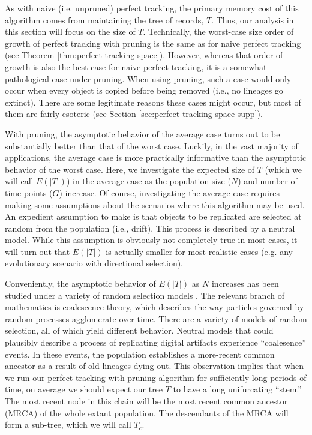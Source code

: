 As with naive (i.e. unpruned) perfect tracking, the primary memory cost of this algorithm comes from maintaining the tree of records, $T$.
Thus, our analysis in this section will focus on the size of $T$.
Technically, the worst-case size order of growth of perfect tracking with pruning is the same as for naive perfect tracking (see Theorem \ref{thm:perfect-tracking-space}).
However, whereas that order of growth is also the best case for naive perfect tracking, it is a somewhat pathological case under pruning.
When using pruning, such a case would only occur when every object is copied before being removed (i.e., no lineages go extinct).
There are some legitimate reasons these cases might occur, but most of them are fairly esoteric (see Section \ref{sec:perfect-tracking-space-supp}).


With pruning, the asymptotic behavior of the average case turns out to be substantially better than that of the worst case. 
Luckily, in the vast majority of applications, the average case is more practically informative than the asymptotic behavior of the worst case.
Here, we investigate the expected size of $T$ (which we will call $E(|T|)$) in the average case as the population size ($N$) and number of time points ($G$) increase.
Of course, investigating the average case requires making some assumptions about the scenarios where this algorithm may be used.
An expedient assumption to make is that objects to be replicated are selected at random from the population (i.e., drift).
This process is described by a neutral model.
While this assumption is obviously not completely true in most cases, it will turn out that $E(|T|)$ is actually smaller for most realistic cases (e.g. any evolutionary scenario with directional selection).

Conveniently, the asymptotic behavior of $E(|T|)$ as $N$ increases has been studied under a variety of random selection models \citep{berestyckiRecentProgressCoalescent2009, tellierCoalescenceMultipleBranching2014, nordborgCoalescentTheory2019}.
The relevant branch of mathematics is coalescence theory, which describes the way particles governed by random processes agglomerate over time.
There are a variety of models of random selection, all of which yield different behavior.
Neutral models that could plausibly describe a process of replicating digital artifacts experience ``coalesence'' events.
In these events, the population establishes a more-recent common ancestor as a result of old lineages dying out.
This observation implies that when we run our perfect tracking with pruning algorithm for sufficiently long periods of time, on average we should expect our tree $T$ to have a long unifurcating ``stem.''
The most recent node in this chain will be the most recent common ancestor (MRCA) of the whole extant population.
The descendants of the MRCA will form a sub-tree, which we will call $T_c$.

